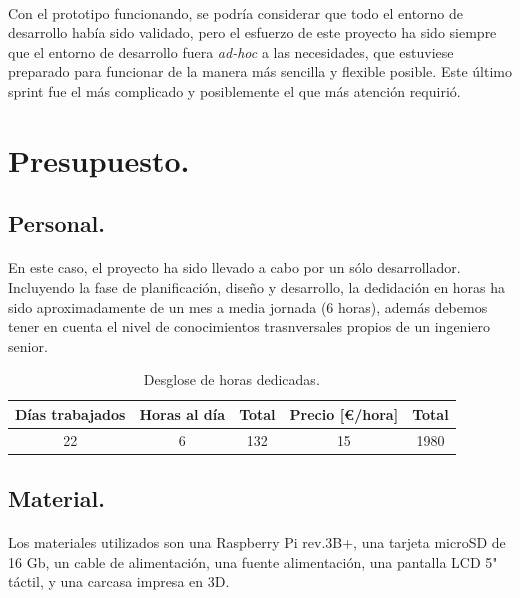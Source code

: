 \paragraph{}Con el prototipo funcionando, se podría considerar que todo el entorno de
desarrollo había sido validado, pero el esfuerzo de este proyecto ha sido siempre que
el entorno de desarrollo fuera \emph{ad-hoc} a las necesidades, que estuviese preparado
para funcionar de la manera más sencilla y flexible posible. Este último sprint fue el
más complicado y posiblemente el que más atención requirió.

\section{Presupuesto.}

\subsection{Personal.}

\paragraph{} En este caso, el proyecto ha sido llevado a cabo por un sólo desarrollador.
Incluyendo la fase de planificación, diseño y desarrollo, la dedidación en horas ha sido
aproximadamente de un mes a media jornada (6 horas), además debemos tener en cuenta el
nivel de conocimientos trasnversales propios de un ingeniero senior.


\begin{table}[hbt]
	\label{t:recursoshumanos}
	\centering
	\begin{tabular}{|c|c|c|c|c|}
		\hline
        \textbf{Días trabajados} & \textbf{Horas al día} & \textbf{Total} & Precio [\euro/hora] & \textbf{Total} \\
		\hline
		22 & 6 & 132 & 15 & 1980 \\
		\hline
	\end{tabular}
	\caption{Desglose de horas dedicadas.}
\end{table}

\subsection{Material.}

\paragraph{}Los materiales utilizados son una Raspberry Pi rev.3B+, una tarjeta microSD
de 16 Gb, un cable de alimentación, una fuente alimentación, una pantalla LCD 5" táctil,
y una carcasa impresa en 3D.



